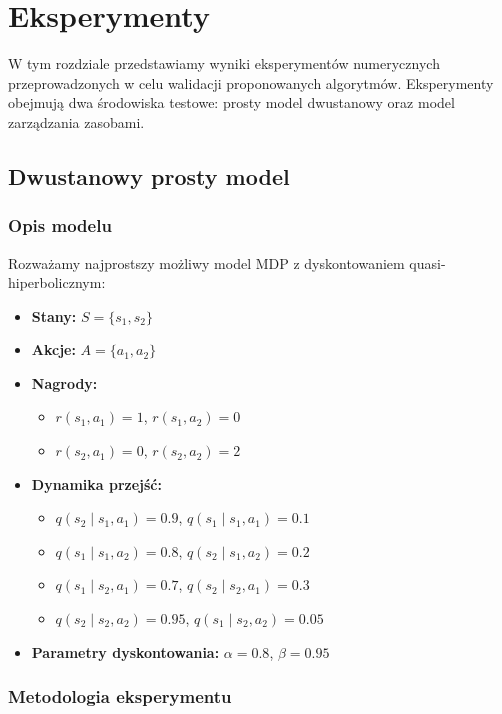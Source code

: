 \chapter{Eksperymenty}

W tym rozdziale przedstawiamy wyniki eksperymentów numerycznych przeprowadzonych w celu walidacji proponowanych algorytmów. Eksperymenty obejmują dwa środowiska testowe: prosty model dwustanowy oraz model zarządzania zasobami.

\section{Dwustanowy prosty model}

\subsection{Opis modelu}

Rozważamy najprostszy możliwy model MDP z dyskontowaniem quasi-hiperbolicznym:

\begin{itemize}
\item \textbf{Stany:} $S = \{s_1, s_2\}$
\item \textbf{Akcje:} $A = \{a_1, a_2\}$
\item \textbf{Nagrody:}
  \begin{itemize}
  \item $r(s_1, a_1) = 1$, $r(s_1, a_2) = 0$
  \item $r(s_2, a_1) = 0$, $r(s_2, a_2) = 2$
  \end{itemize}
\item \textbf{Dynamika przejść:}
  \begin{itemize}
  \item $q(s_2 \mid s_1, a_1) = 0.9$, $q(s_1 \mid s_1, a_1) = 0.1$
  \item $q(s_1 \mid s_1, a_2) = 0.8$, $q(s_2 \mid s_1, a_2) = 0.2$
  \item $q(s_1 \mid s_2, a_1) = 0.7$, $q(s_2 \mid s_2, a_1) = 0.3$
  \item $q(s_2 \mid s_2, a_2) = 0.95$, $q(s_1 \mid s_2, a_2) = 0.05$
  \end{itemize}
\item \textbf{Parametry dyskontowania:} $\alpha = 0.8$, $\beta = 0.95$
\end{itemize}

\subsection{Metodologia eksperymentu}

